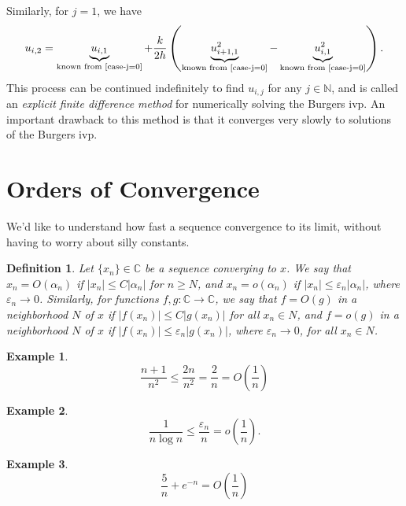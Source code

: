 \documentclass[12pt,reqno]{amsart}
\numberwithin{equation}{section}  %
\newcommand{\cc}{\mathbb{C}}
\newcommand{\ee}{\varepsilon}
\newtheorem{definition}[theorem]{Definition}
\newtheorem{example}{Example}[section]
\begin{document}
Similarly, for $j=1$, we have
\begin{equation*}
\begin{split}
u_{i,2} = \underbrace{u_{i,1}}_{\text{known from
\eqref{case-j=0}}} + \frac{k}{2h}\left(
\underbrace{u_{i+1,1}^{2}}_{\text{known from \eqref{case-j=0}}} -
\underbrace{u_{i,1}^{2}}_{\text{known from
\eqref{case-j=0}}} \right).
\end{split}
\end{equation*} 
This process can be
continued indefinitely to find $u_{i, j}$ for any $j \in \mathbb{N}$, and is
called an \emph{explicit finite difference method} for numerically solving the
Burgers ivp. An important drawback to this method is that it converges very
slowly to solutions of the Burgers ivp.
\section{Orders of Convergence}
We'd like to understand how fast a sequence convergence to its limit, without
having to worry about silly constants.
\begin{definition}
Let $\{x_{n}\} \in \mathbb{C}$ be a sequence converging to $x$. We say that
$x_{n} = O(\alpha_{n})$ if $|x_{n}| \le C |\alpha_{n}|$  for $n \ge N$, and $ x_n 
= o(\alpha_n )$ if $|x_n| \le \ee_n |\alpha_n |$, where $\ee_n \to 0$.
Similarly, for functions $f,g: \cc \to \cc$, we say that $f = O(g)$ in a
neighborhood $N$ of $x$ if $|f(x_n) | \le C |g(x_n)|$ for all $x_n \in N$, and 
$f = o(g)$ in a neighborhood $N$ of $x$ if $|f(x_n) | \le \ee_n |g(x_n)|$,
where $\ee_n \to 0$,  for all $x_n \in N$.
\end{definition}

\begin{example}
\begin{equation*}
\frac{n+1}{n^2} \le \frac{2n}{n^2} = \frac{2}{n} = O\left(\frac{1}{n} \right)	
\end{equation*}
\end{example}
\begin{example}
\begin{equation*}
\frac{1}{n \log n} \le \frac{\ee_n}{n} = o\left(\frac{1}{n}\right).
\end{equation*}
\end{example}

\begin{example}
\begin{equation*}
\frac{5}{n} + e^{-n} = O\left( \frac{1}{n}\right)
\end{equation*}
\end{example}
\end{document}
